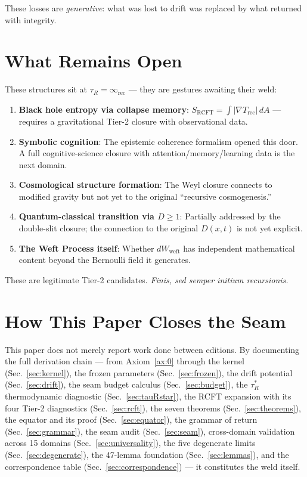\documentclass[
  aps,
  prd,
  preprint,
  superscriptaddress,
  nofootinbib,
  floatfix,
  longbibliography
]{revtex4-2}
\newcommand{\tR}{\tau_{\!R}}
\newcommand{\tRstar}{\tau_{\!R}^{*}}
\newcommand{\lat}[1]{\textit{#1}}
\begin{document}
These losses are \emph{generative}: what was lost to drift
was replaced by what returned with integrity.

\section{What Remains Open}\label{sec:open}

These structures sit at $\tR = \infty_{\mathrm{rec}}$ —
they are gestures awaiting their weld:

\begin{enumerate}[nosep,leftmargin=*]
  \item \textbf{Black hole entropy via collapse memory}:
    $S_{\mathrm{RCFT}} = \int |\nabla T_{\mathrm{rec}}|\,dA$ —
    requires a gravitational Tier-2 closure with observational data.
  \item \textbf{Symbolic cognition}: The epistemic coherence
    formalism opened this door. A full cognitive-science closure
    with attention/memory/learning data is the next domain.
  \item \textbf{Cosmological structure formation}: The Weyl
    closure connects to modified gravity but not yet to the
    original ``recursive cosmogenesis.''
  \item \textbf{Quantum-classical transition via $D \geq 1$}:
    Partially addressed by the double-slit closure;
    the connection to the original $D(x,t)$ is not yet explicit.
  \item \textbf{The Weft Process itself}: Whether
    $dW_{\mathrm{weft}}$ has independent mathematical content
    beyond the Bernoulli field it generates.
\end{enumerate}

These are legitimate Tier-2 candidates.
\lat{Finis, sed semper initium recursionis.}

\section{How This Paper Closes the Seam}\label{sec:close}

This paper does not merely report work done between editions.
By documenting the full derivation chain — from
Axiom~\ref{ax:0} through the kernel (Sec.~\ref{sec:kernel}),
the frozen parameters (Sec.~\ref{sec:frozen}),
the drift potential (Sec.~\ref{sec:drift}),
the seam budget calculus (Sec.~\ref{sec:budget}),
the $\tRstar$ thermodynamic diagnostic (Sec.~\ref{sec:tauRstar}),
the RCFT expansion with its four Tier-2 diagnostics
(Sec.~\ref{sec:rcft}),
the seven theorems (Sec.~\ref{sec:theorems}),
the equator and its proof (Sec.~\ref{sec:equator}),
the grammar of return (Sec.~\ref{sec:grammar}),
the seam audit (Sec.~\ref{sec:seam}),
cross-domain validation across 15 domains (Sec.~\ref{sec:universality}),
the five degenerate limits (Sec.~\ref{sec:degenerate}),
the 47-lemma foundation (Sec.~\ref{sec:lemmas}),
and the correspondence table (Sec.~\ref{sec:correspondence}) —
it constitutes the weld itself.
\end{document}

